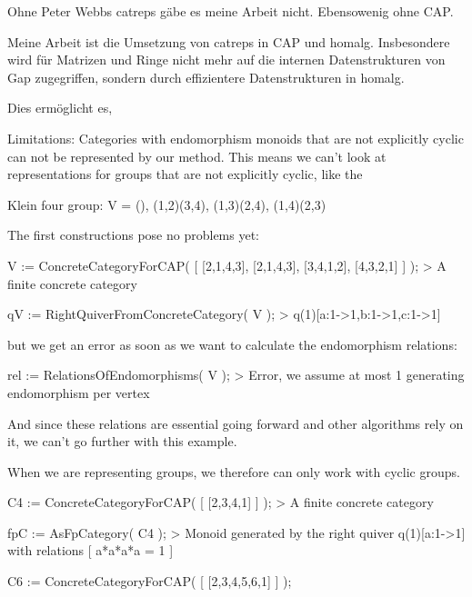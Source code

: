 \documentclass[12pt,compress]{beamer}
\begin{document}
Ohne Peter Webbs catreps gäbe es meine Arbeit nicht. Ebensowenig ohne CAP.

Meine Arbeit ist die Umsetzung von catreps in CAP und homalg. Insbesondere wird für
Matrizen und Ringe nicht mehr auf die internen Datenstrukturen von Gap zugegriffen, sondern
durch effizientere Datenstrukturen in homalg.

Dies ermöglicht es, 





Limitations: Categories with endomorphism monoids that are not explicitly cyclic
can not be represented by our method. This means we can't look at representations
for groups that are not explicitly cyclic, like the

Klein four group: V = {(), (1,2)(3,4), (1,3)(2,4), (1,4)(2,3) }

The first constructions pose no problems yet:

V := ConcreteCategoryForCAP( [ [2,1,4,3], [2,1,4,3], [3,4,1,2], [4,3,2,1] ] );
> A finite concrete category

qV := RightQuiverFromConcreteCategory( V );
> q(1)[a:1->1,b:1->1,c:1->1]

but we get an error as soon as we want to calculate the endomorphism relations:

rel := RelationsOfEndomorphisms( V );
> Error, we assume at most 1 generating endomorphism per vertex

And since these relations are essential going forward and other algorithms rely on it,
we can't go further with this example.

When we are representing groups, we therefore can only work with cyclic groups.

C4 := ConcreteCategoryForCAP( [ [2,3,4,1] ] );
> A finite concrete category

fpC := AsFpCategory( C4 );
> Monoid generated by the right quiver q(1)[a:1->1] with relations [ a*a*a*a = 1 ]


C6 := ConcreteCategoryForCAP( [ [2,3,4,5,6,1] ] );
\end{document}
